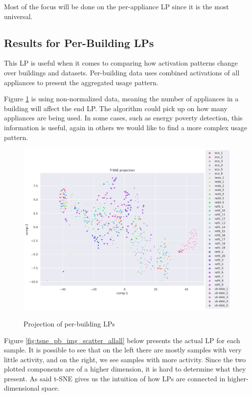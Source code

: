 Most of the focus will be done on the per-appliance LP since it is the most universal.

\subsection{Results for Per-Building LPs}
\label{ssec:res_pb_lp}
This LP is useful when it comes to comparing how 
activation patterns change over buildings and datasets.
Per-building data uses combined activations of all appliances to present 
the aggregated usage pattern. 

Figure \ref{fig:tsne_scatter_non_norm_all} is using non-normalized data, meaning
the number of appliances in a building will affect the end LP.
The algorithm could pick up on how many appliances are being used.
In some cases, such as energy poverty detection, this information is useful, 
again in others we would like to find a more complex usage pattern.

\begin{figure}[H]
	\centering
	\caption{Projection of per-building LPs}
	\includegraphics[width=1.2\textwidth]{Figures/TSNE/TSNE_per_building/non_norm/scatter_non_norm_all.png}
	\label{fig:tsne_scatter_non_norm_all}
\end{figure}

Figure \ref{fig:tsne_pb_img_scatter_allall} below presents the actual LP for each sample. 
It is possible to see that on the left there are mostly samples with very little activity,
and on the right, we see samples with more activity.
Since the two plotted components are of a higher dimension, it is hard to determine what they present.
As said t-SNE gives us the intuition of how LPs are connected in higher-dimensional space.

